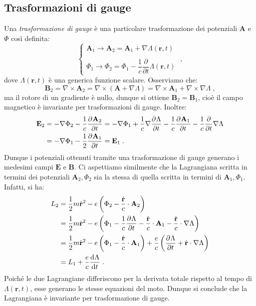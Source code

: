 \subsection{Trasformazioni di gauge}
Una \textit{trasformazione di gauge} è una particolare trasformazione dei potenziali $\mathbf{A}$ e $\Phi$ così definita:
\begin{equation}
\begin{cases}
\mathbf{A}_1\to\mathbf{A}_2=\mathbf{A}_1+\nabla\Lambda(\mathbf{r},t) \\
\\
\Phi_1\to\Phi_2=\Phi_1-\dfrac{1}{c}\dfrac{\partial}{\partial t}\Lambda(\mathbf{r},t)
\end{cases}\;,
\end{equation}
dove $\Lambda(\mathbf{r},t)$ è una generica funzione scalare. Osserviamo che:
\begin{equation}
\mathbf{B}_2=\nabla\times \mathbf{A}_2=\nabla\times(\mathbf{A}+\nabla\Lambda)=\nabla\times\mathbf{A}_1+\nabla\times\nabla\Lambda\;,
\end{equation}
ma il rotore di un gradiente è nullo, dunque si ottiene $\mathbf{B}_2=\mathbf{B}_1$, cioè il campo magnetico è invariante per trasformazioni di gauge. Inoltre:
\begin{align}
\mathbf{E}_2&=-\nabla\Phi_2-\frac{1}{c}\frac{\partial^{}\mathbf{A}_2}{\partial t^{}}=-\nabla\Phi_1+\frac{1}{c}\nabla\frac{\partial^{}\Lambda}{\partial t^{}}-\frac{1}{c}\frac{\partial^{}\mathbf{A}_1}{\partial t^{}}-\frac{1}{c}\frac{\partial}{\partial t}\nabla\Lambda \notag \\
&=-\nabla\Phi_1-\frac{1}{2}\frac{\partial^{}\mathbf{A}_1}{\partial t^{}}=\mathbf{E}_1\;.
\end{align}
Dunque i potenziali ottenuti tramite una trasformazione di gauge generano i medesimi campi $\mathbf{E}$ e $\mathbf{B}$. Ci aspettiamo similmente che la Lagrangiana scritta in termini dei potenziali $\mathbf{A}_2,\Phi_2$ sia la stessa di quella scritta in termini di $\mathbf{A}_1,\Phi_1$. Infatti, si ha:
\begin{align}
L_2 &= \frac{1}{2}m\dot{\mathbf{r}}^2-e\left(\Phi_2-\frac{\dot{\mathbf{r}}}{c}\cdot\mathbf{A}_2\right) \\
&=\frac{1}{2}m\dot{\mathbf{r}}^2-e\left(\Phi_1-\frac{1}{c}\frac{\partial^{}\Lambda}{\partial t^{}}-\frac{\dot{\mathbf{r}}}{c}\cdot \mathbf{A}_1-\frac{\dot{\mathbf{r}}}{c}\cdot\nabla\Lambda\right) \notag \\
&= \frac{1}{2}m\dot{\mathbf{r}}^2-e\left(\Phi_1-\frac{\dot{\mathbf{r}}}{c}\cdot\mathbf{A}_1\right)+\frac{e}{c}\left(\frac{\partial^{}\Lambda}{\partial t^{}}+\dot{\mathbf{r}}\cdot\nabla\Lambda\right)\notag \\
&= L_1+\frac{e}{c}\frac{\mathrm{d}^{}\Lambda}{\mathrm{d}t^{}}\;.
\end{align}
Poiché le due Lagrangiane differiscono per la derivata totale rispetto al tempo di $\Lambda(\mathbf{r},t)$, esse generano le stesse equazioni del moto. Dunque si conclude che la Lagrangiana è invariante per trasformazione di gauge.
\pagebreak
